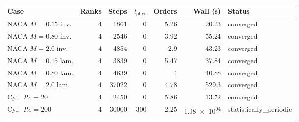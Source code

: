 \begin{tabular}{lrrrrrl}
\toprule
Case & Ranks & Steps & $t_{\mathrm{phys}}$ & Orders & Wall (s) & Status \\
\midrule
NACA $M{=}0.15$ inv. & \num{4} & \num{1861} & \num{0} & \num{5.26} & \num{20.23} & converged \\
NACA $M{=}0.80$ inv. & \num{4} & \num{2546} & \num{0} & \num{3.92} & \num{55.24} & converged \\
NACA $M{=}2.0$ inv. & \num{4} & \num{4854} & \num{0} & \num{2.9} & \num{43.23} & converged \\
NACA $M{=}0.15$ lam. & \num{4} & \num{3839} & \num{0} & \num{5.47} & \num{37.84} & converged \\
NACA $M{=}0.80$ lam. & \num{4} & \num{4639} & \num{0} & \num{4} & \num{40.88} & converged \\
NACA $M{=}2.0$ lam. & \num{4} & \num{37022} & \num{0} & \num{4.78} & \num{529.3} & converged \\
Cyl.\ $Re{=}20$ & \num{4} & \num{2450} & \num{0} & \num{5.86} & \num{13.72} & converged \\
Cyl.\ $Re{=}200$ & \num{4} & \num{30000} & \num{300} & \num{2.25} & \num{1.08e+04} & statistically\_periodic \\
\bottomrule
\end{tabular}
